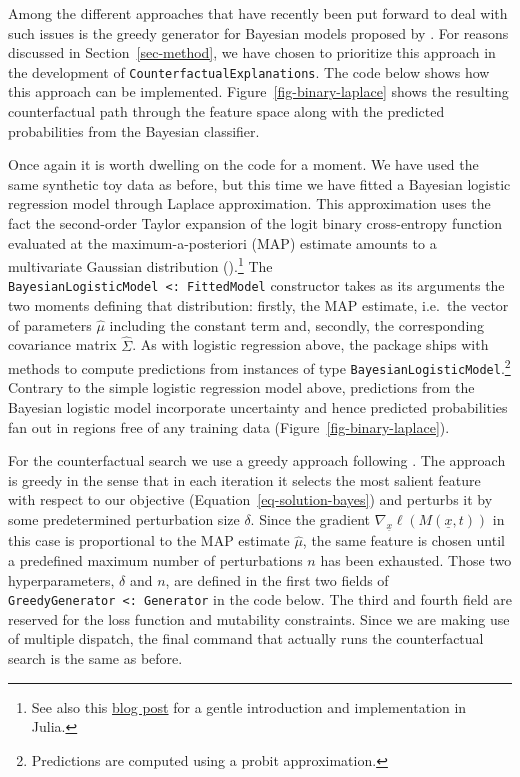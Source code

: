 \documentclass[
  letterpaper,
  DIV=11,
  numbers=noendperiod]{scrartcl}
\begin{document}
Among the different approaches that have recently been put forward to
deal with such issues is the greedy generator for Bayesian models
proposed by \cite{schut2021generating}. For reasons discussed in
Section~\ref{sec-method}, we have chosen to prioritize this approach in
the development of \texttt{CounterfactualExplanations}. The code below
shows how this approach can be implemented.
Figure~\ref{fig-binary-laplace} shows the resulting counterfactual path
through the feature space along with the predicted probabilities from
the Bayesian classifier.

Once again it is worth dwelling on the code for a moment. We have used
the same synthetic toy data as before, but this time we have fitted a
Bayesian logistic regression model through Laplace approximation. This
approximation uses the fact the second-order Taylor expansion of the
logit binary cross-entropy function evaluated at the
maximum-a-posteriori (MAP) estimate amounts to a multivariate Gaussian
distribution (\cite{murphy2022probabilistic}).\footnote{See also this
  \href{https://www.paltmeyer.com/blog/posts/effortsless-bayesian-dl/}{blog
  post} for a gentle introduction and implementation in Julia.} The
\texttt{BayesianLogisticModel\ \textless{}:\ FittedModel} constructor
takes as its arguments the two moments defining that distribution:
firstly, the MAP estimate, i.e.~the vector of parameters \(\hat\mu\)
including the constant term and, secondly, the corresponding covariance
matrix \(\hat{\Sigma}\). As with logistic regression above, the package
ships with methods to compute predictions from instances of type
\texttt{BayesianLogisticModel}.\footnote{Predictions are computed using
  a probit approximation.} Contrary to the simple logistic regression
model above, predictions from the Bayesian logistic model incorporate
uncertainty and hence predicted probabilities fan out in regions free of
any training data (Figure~\ref{fig-binary-laplace}).

For the counterfactual search we use a greedy approach following
\cite{schut2021generating}. The approach is greedy in the sense that in
each iteration it selects the most salient feature with respect to our
objective (Equation~\ref{eq-solution-bayes}) and perturbs it by some
predetermined perturbation size \(\delta\). Since the gradient
\(\nabla_{\underline{x}}\ell(M(\underline{x},t))\) in this case is
proportional to the MAP estimate \(\hat\mu\), the same feature is chosen
until a predefined maximum number of perturbations \(n\) has been
exhausted. Those two hyperparameters, \(\delta\) and \(n\), are defined
in the first two fields of
\texttt{GreedyGenerator\ \textless{}:\ Generator} in the code below. The
third and fourth field are reserved for the loss function and mutability
constraints. Since we are making use of multiple dispatch, the final
command that actually runs the counterfactual search is the same as
before.
\end{document}
